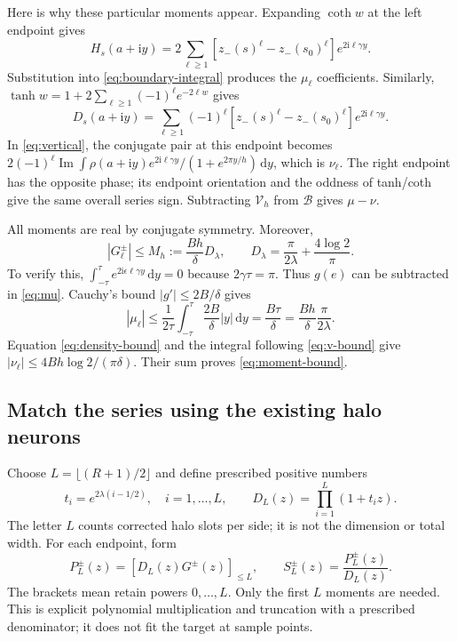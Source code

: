 \documentclass[11pt]{article}
\newcommand{\ii}{\mathrm i}
\newcommand{\dd}{\,\mathrm d}
\newcommand{\Imag}{\operatorname{Im}}
\begin{document}
Here is why these particular moments appear. Expanding $\coth w$ at the left endpoint gives
\[
 H_s(a+\ii y)=2\sum_{\ell\ge1}
 [z_-(s)^\ell-z_-(s_0)^\ell]e^{2\ii\ell\gamma y}.
\]
Substitution into \eqref{eq:boundary-integral} produces the $\mu_\ell$ coefficients. Similarly,
$\tanh w=1+2\sum_{\ell\ge1}(-1)^\ell e^{-2\ell w}$ gives
\[
 D_s(a+\ii y)=\sum_{\ell\ge1}(-1)^\ell
 [z_-(s)^\ell-z_-(s_0)^\ell]e^{2\ii\ell\gamma y}.
\]
In \eqref{eq:vertical}, the conjugate pair at this endpoint becomes
$2(-1)^\ell\Imag\int\rho(a+\ii y)e^{2\ii\ell\gamma y}/(1+e^{2\pi y/h})\dd y$, which is $\nu_\ell$. The right endpoint has the opposite phase; its endpoint orientation and the oddness of tanh/coth give the same overall series sign. Subtracting $\mathcal V_h$ from $\mathcal B$ gives $\mu-\nu$.

All moments are real by conjugate symmetry. Moreover,
\begin{equation}
 |G_\ell^\pm|\le M_h:=\frac{Bh}{\delta}D_\lambda,
 \qquad D_\lambda=\frac\pi{2\lambda}+\frac{4\log2}{\pi}.
 \label{eq:moment-bound}
\end{equation}
To verify this, $\int_{-\tau}^{\tau}e^{2\ii\epsilon\ell\gamma y}\dd y=0$ because $2\gamma\tau=\pi$. Thus $g(e)$ can be subtracted in \eqref{eq:mu}. Cauchy's bound $|g'|\le2B/\delta$ gives
\[
 |\mu_\ell|\le\frac1{2\tau}\int_{-\tau}^{\tau}
 \frac{2B}{\delta}|y|\dd y=\frac{B\tau}{\delta}
 =\frac{Bh}{\delta}\frac\pi{2\lambda}.
\]
Equation \eqref{eq:density-bound} and the integral following \eqref{eq:v-bound} give
$|\nu_\ell|\le4Bh\log2/(\pi\delta)$. Their sum proves \eqref{eq:moment-bound}.

\subsection{Match the series using the existing halo neurons}

Choose $L=\lfloor(R+1)/2\rfloor$ and define prescribed positive numbers
\[
 t_i=e^{2\lambda(i-1/2)},\quad i=1,\ldots,L,\qquad
 D_L(z)=\prod_{i=1}^L(1+t_i z).
\]
The letter $L$ counts corrected halo slots per side; it is not the dimension or total width. For each endpoint, form
\begin{equation}
 P_L^\pm(z)=[D_L(z)G^\pm(z)]_{\le L},\qquad
 S_L^\pm(z)=\frac{P_L^\pm(z)}{D_L(z)}.
 \label{eq:rational-correction}
\end{equation}
The brackets mean retain powers $0,\ldots,L$. Only the first $L$ moments are needed. This is explicit polynomial multiplication and truncation with a prescribed denominator; it does not fit the target at sample points.
\end{document}
